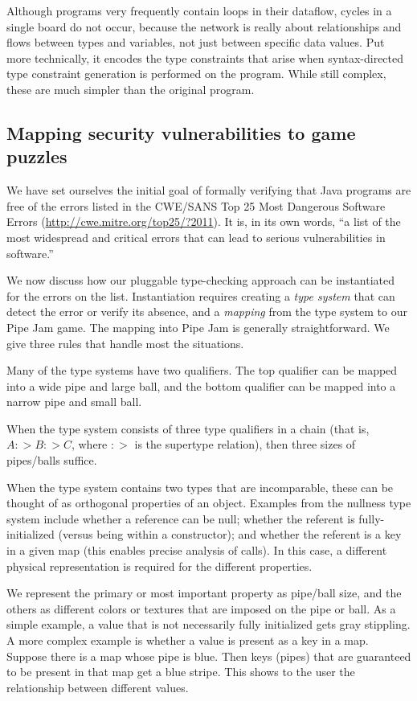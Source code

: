\documentclass[preprint]{sig-alternate}
\def\<#1>{\codeid{#1}}
\newcommand{\codeid}[1]{\ifmmode{\mbox{\ttfamily{#1}}}\else{\ttfamily #1}\fi}
\newcommand{\todo}[1]{\relax}
\let\Itemize =\itemize
\def\Nospacing{\itemsep=0pt\topsep=0pt\partopsep=0pt\parskip=0pt\parsep=0pt}
\renewenvironment{itemize}{\Itemize\Nospacing}{\endlist}
\begin{document}
Although programs very frequently contain loops in their dataflow,
cycles in a single board do not occur, because the network is really
about relationships and flows between types and variables, not just
between specific data values.  Put more technically, it encodes the
type constraints that arise when syntax-directed type constraint
generation is performed on the program.  While still complex, these
are much simpler than the original program.


\subsection{Mapping security vulnerabilities to game puzzles}

\todo{I don't want to list all 25 type systems. Some of these
  descriptions need to be adapted more.}

We have set ourselves the initial goal of formally verifying that Java
programs are free of the errors
listed in the CWE/SANS Top 25 Most Dangerous Software Errors
(\url{http://cwe.mitre.org/top25/?2011}).  It is, in its own words,
``a list of the most widespread and critical errors that can lead to
serious vulnerabilities in software.''

We now discuss how our pluggable type-checking approach can be
instantiated for the errors on the list.  Instantiation requires
creating a \emph{type system} that can detect the error or verify its
absence, and a \emph{mapping} from the type system to our Pipe Jam
game.  The mapping into Pipe Jam is generally straightforward.  We
give three rules that handle most the situations.
%
\begin{itemize}
\item
  Many of the type systems have two qualifiers.  The top qualifier can be
  mapped into a wide pipe and large ball, and the bottom qualifier can be
  mapped into a narrow pipe and small ball.
\item
  When the type system consists of three type qualifiers in a chain (that
  is, $A :> B :> C$, where $:>$ is the supertype relation), then three
  sizes of pipes/balls suffice.
\item
  When the type system contains two types that are incomparable, these
  can be thought of as orthogonal properties of an object.  Examples
  from the nullness type system include whether a reference can be
  null; whether the referent is fully-initialized (versus being
  \<this> within a constructor); and whether the referent is a key in
  a given map (this enables precise analysis of \<Map.get()> calls).
  In this case, a different physical representation is required for
  the different properties.

  We represent the primary or most important property as pipe/ball
  size, and the others as different colors or textures that are
  imposed on the pipe or ball.  As a simple example, a value that is
  not necessarily fully initialized gets gray stippling.  A more
  complex example is whether a value is present as a key in a map.
  Suppose there is a map whose pipe is blue.  Then keys (pipes) that are
  guaranteed to be present in that map get a blue stripe.  This shows
  to the user the relationship between different values.
\end{itemize}
\end{document}
